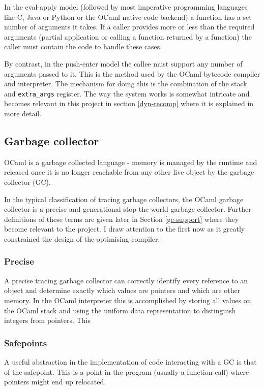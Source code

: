 In the eval-apply model (followed by most imperative programming languages like C, Java or Python
or
the OCaml native code backend) a function has a set number of arguments it takes. If a caller
provides more or less than the required arguments (partial application or calling a function
returned by a function) the caller must contain the code to handle these cases.

By contrast, in the push-enter model the callee must support any number of arguments passed to it.
This is the method used by the OCaml bytecode compiler and interpreter. The mechanism for doing
this is the combination of the stack and \texttt{extra\_args} register. The way the system works is
somewhat intricate and becomes relevant in this project in section \ref{dyn-recomp} where it is
explained in more detail.

\subsection{Garbage collector}

OCaml is a garbage collected language - memory is managed by the runtime and released once it is
no longer reachable from any other live object by the garbage collector (GC).

In the typical classification of tracing garbage collectors, the OCaml garbage collector is a
precise and generational stop-the-world garbage collector. Further definitions of these terms are
given later in Section \ref{gc-support} where they become relevant to the project. I draw attention
to the first now as it greatly constrained the design of the optimising compiler:

\subsubsection{Precise}

A precise tracing garbage collector can correctly identify every reference to an object and
determine exactly which values are pointers and which are other memory. In the OCaml interpreter
this is accomplished by storing all values on the OCaml stack and using the uniform data
representation to distinguish integers from pointers. This

\subsubsection{Safepoints}

A useful abstraction in the implementation of code interacting with a GC is that of the safepoint.
This is a point in the program (usually a function call) where pointers might end up relocated.

